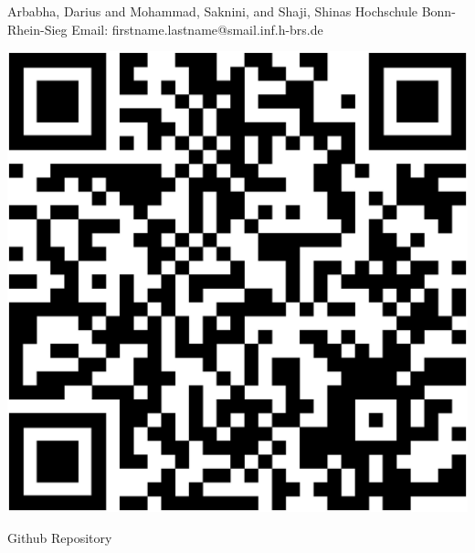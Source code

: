 

{
	\vspace*{1cm}
    \begin{minipage}{0.75\linewidth}
        \vspace*{-2.5cm}
        Arbabha, Darius and Mohammad, Saknini, and Shaji, Shinas\newline
        Hochschule Bonn-Rhein-Sieg\newline
        Email: firstname.lastname@smail.inf.h-brs.de\newline
    \end{minipage}
    \begin{minipage}{0.24\linewidth}
        \centering
        \vspace{-1.5cm}
        \begin{tikzfigure}
            \includegraphics[scale=0.125]{figures/qrcode.eps}
        \end{tikzfigure}
        Github Repository
    \end{minipage}
    \vspace*{-3cm}
    
}


